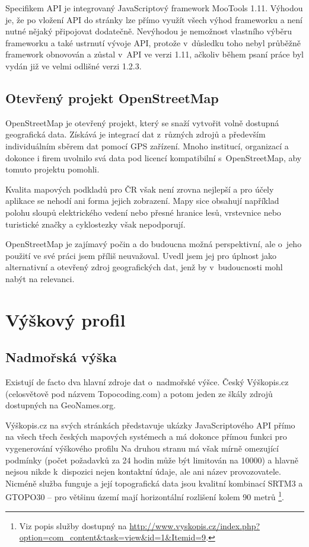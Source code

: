 Specifikem API je integrovaný JavaScriptový framework MooTools 1.11.
Výhodou je, že po vložení API do stránky lze přímo využít všech výhod
frameworku a není nutné nějaký připojovat dodatečně. Nevýhodou je
nemožnost vlastního výběru frameworku a také ustrnutí vývoje API,
protože v~důsledku toho nebyl průběžně framework obnovován a zůstal
v~API ve verzi 1.11, ačkoliv během psaní práce byl vydán již ve
velmi odlišné verzi 1.2.3.

\subsection{Otevřený projekt OpenStreetMap}
OpenStreetMap je otevřený projekt, který se snaží vytvořit volně
dostupná geografická data. Získává je integrací dat z~různých zdrojů
a především individuálním sběrem dat pomocí GPS zařízení. Mnoho
institucí, organizací a dokonce i firem uvolnilo svá data pod licencí
kompatibilní s~OpenStreetMap, aby tomuto projektu pomohli.

Kvalita mapových podkladů pro ČR však není zrovna nej\-lepší a
pro účely aplikace se nehodí ani forma jejich zobrazení. Mapy sice
obsahují například polohu sloupů elektrického vedení nebo přesné
hranice lesů, vrstevnice nebo turistické značky a cyklostezky však
nepodporují.

OpenStreetMap je zajímavý počin a do budoucna možná perspektivní, ale
o~jeho použití ve své práci jsem příliš neuvažoval. Uvedl jsem jej
pro úplnost jako alternativní a otevřený zdroj geografických dat,
jenž by v~budoucnosti mohl nabýt na relevanci.

\section{Výškový profil}\label{vyskovyProfil}
\subsection{Nadmořská výška}\label{vyskopis}
Existují de facto dva hlavní zdroje dat o~nadmořské výšce.
Český Výškopis.cz (celosvětově pod názvem Topocoding.com) a potom
jeden ze škály zdrojů dostupných na GeoNames.org.

Výškopis.cz na svých stránkách představuje ukázky JavaScriptového API
přímo na všech třech českých mapových systémech a má dokonce přímou funkci pro
vygenerování výškového profilu Na druhou stranu má však mírně
omezující podmínky (počet požadavků za 24 hodin může být
limitován na 10000) a hlavně nejsou nikde k~dispozici nejen kontaktní
údaje, ale ani název provozovatele. Nicméně služba funguje a
její topografická data jsou kvalitní kombinací SRTM3 a GTOPO30 -- pro
většinu území mají horizontální rozlišení kolem 90 metrů
\footnote{Viz popis služby dostupný na
\url{http://www.vyskopis.cz/index.php?option=com_content&task=view&id=1&Itemid=9}.}.

